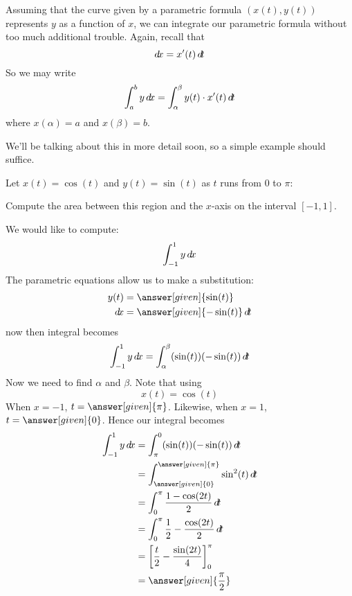 \documentclass{ximera}
\begin{document}
Assuming that the curve given by a parametric formula $(x(t),y(t))$
represents $y$ as a function of $x$, we can integrate our parametric
formula without too much additional trouble.
Again, recall that
\[
\mathop{}\!d\! x = x'(t) \mathop{}\!d\! t
\]
So we may write
\[
\int_a^b y \mathop{}\!d\! x = \int_\alpha^\beta y(t) \cdot x'(t) \mathop{}\!d\! t
\]
where $x(\alpha) = a$ and $x(\beta) = b$.

We'll be talking about this in more detail soon, so a simple example
should suffice.

\begin{example}
  Let $x(t) = \cos(t)$ and $y(t)= \sin(t)$ as $t$ runs from $0$ to
  $\pi$:
  \begin{image}
  \end{image}
  Compute the area between this region and the $x$-axis on the
  interval $[-1,1]$.
  \begin{explanation}
    We would like to compute:
    \[
    \int_{-1}^1 y \mathop{}\!d\! x
    \]
    The parametric equations allow us to make a substitution: 
    \begin{align*}
      y(t) &=\answer[given]{\sin(t)}\\
      \d x &=\answer[given]{-\sin(t)}\d t
    \end{align*}
    now then integral becomes
    \[
    \int_{-1}^{1} y \mathop{}\!d\! x= \int_\alpha^\beta (\sin(t))(-\sin(t))\mathop{}\!d\! t
    \]
    Now we need to find $\alpha$ and $\beta$. Note that using
    \[
    x(t)=\cos(t)
    \]
    When $x=-1$, $t=\answer[given]{\pi}$. Likewise, when $x=1$, $t=\answer[given]{0}$. Hence our
    integral becomes
    \begin{align*}
      \int_{-1}^{1} y \d x&= \int_\pi^0 (\sin(t))(-\sin(t))\d t\\
      &= \int_{\answer[given]{0}}^{\answer[given]{\pi}}\sin^2(t)\d t\\
      &= \int_0^\pi\frac{1-\cos(2t)}{2}\d t\\
      &= \int_0^\pi\frac{1}{2}-\frac{\cos(2t)}{2}\d t\\
      &= \eval{\frac{t}{2}-\frac{\sin(2t)}{4}}_0^\pi\\
      &= \answer[given]{\frac{\pi}{2}}
    \end{align*}
  \end{explanation}
\end{example}
\end{document}
